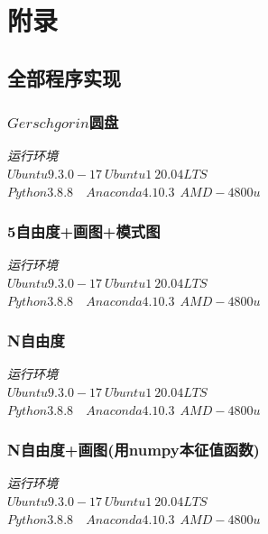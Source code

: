 \documentclass[11pt, a4paper, oneside]{ctexart}
\begin{document}
{{{\newpage
\section{附录}
\begin{appendices}
    \renewcommand{\thesection}{\Alph{section}}
    \subsection{全部程序实现}
    \subsubsection{$Gerschgorin$圆盘}
        {    \begin{flushright}
    \scriptsize\emph{运行环境\\$Ubuntu 9.3.0-17\ Ubuntu1~20.04LTS$}\\
    \scriptsize\emph{$Python 3.8.8$\ \ $Anaconda 4.10.3\ \  AMD-4800u$}
        
    \end{flushright}

    }
    \subsubsection{5自由度+画图+模式图}
    {    \begin{flushright}
        \scriptsize\emph{运行环境\\$Ubuntu 9.3.0-17\ Ubuntu1~20.04LTS$}\\
        \scriptsize\emph{$Python 3.8.8$\ \ $Anaconda 4.10.3\ \  AMD-4800u$}
            
        \end{flushright}
    
        }
        \subsubsection{N自由度}
    {    \begin{flushright}
        \scriptsize\emph{运行环境\\$Ubuntu 9.3.0-17\ Ubuntu1~20.04LTS$}\\
        \scriptsize\emph{$Python 3.8.8$\ \ $Anaconda 4.10.3\ \  AMD-4800u$}
            
        \end{flushright}
    
        }
        \subsubsection{N自由度+画图(用numpy本征值函数)}
        {    \begin{flushright}
            \scriptsize\emph{运行环境\\$Ubuntu 9.3.0-17\ Ubuntu1~20.04LTS$}\\
            \scriptsize\emph{$Python 3.8.8$\ \ $Anaconda 4.10.3\ \  AMD-4800u$}
                

\end{flushright}}
\end{appendices}}}}
\end{document}
